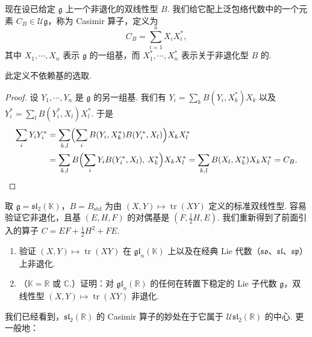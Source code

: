 \begin{numpara}[非退化不变双线性型]\label{np:lie-2-2-3}
现在设已给定 $\mathfrak g$ 上一个非退化的双线性型 $B$. 我们给它配上泛包络代数中的一个元素 $C_B\in\mathcal U\mathfrak g$，称为 Casimir 算子，定义为
\[
C_B=\sum_{i=1}^{n}X_iX_i^{*},
\]
其中 $X_1,\cdots,X_n$ 表示 $\mathfrak g$ 的一组基，而 $X_1^{*},\cdots,X_n^{*}$ 表示关于非退化型 $B$ 的.
\end{numpara}

\begin{lemma*}
此定义不依赖基的选取.
\end{lemma*}

\begin{proof}
设 $Y_1,\cdots,Y_n$ 是 $\mathfrak g$ 的另一组基. 我们有 $Y_i=\sum_k B(Y_i,X_k^{*})X_k$ 以及 $Y_i^{*}=\sum_l B(Y_i^{*},X_l)X_l^{*}$. 于是
\begin{align*}
\sum_i Y_iY_i^{*}
&=\sum_{k,l}\Bigl(\sum_i B(Y_i,X_k^{*})B(Y_i^{*},X_l)\Bigr)X_kX_l^{*}\\
&=\sum_{k,l}B\Bigl(\sum_i Y_iB(Y_i^{*},X_l),\,X_k^{*}\Bigr)X_kX_l^{*}
=\sum_{k,l}B(X_l,X_k^{*})X_kX_l^{*}=C_B.
\end{align*}
\end{proof}

\begin{example*}
取 $\mathfrak g=\mathfrak{sl}_2(\mathbb K)$，$B=B_{\mathrm{std}}$ 为由 $(X,Y)\mapsto\operatorname{tr}(XY)$ 定义的标准双线性型. 容易验证它非退化，且基 $(E,H,F)$ 的对偶基是 $(F,\tfrac12H,E)$. 我们重新得到了前面引入的算子 $C=EF+\tfrac12H^2+FE$.
\end{example*}

\begin{exercise*}
\begin{enumerate}[label=\roman*)]
\item 验证 $(X,Y)\mapsto\operatorname{tr}(XY)$ 在 $\mathfrak{gl}_n(\mathbb K)$ 上以及在经典 Lie 代数（$\mathfrak{so}$、$\mathfrak{sl}$、$\mathfrak{sp}$）上非退化.
\item （$\mathbb K=\mathbb R$ 或 $\mathbb C$.）证明：对 $\mathfrak{gl}_n(\mathbb R)$ 的任何在转置下稳定的 Lie 子代数 $\mathfrak g$，双线性型 $(X,Y)\mapsto\operatorname{tr}(XY)$ 非退化.
\end{enumerate}
\end{exercise*}

我们已经看到，$\mathfrak{sl}_2(\mathbb R)$ 的 Casimir 算子的妙处在于它属于 $\mathcal U\mathfrak{sl}_2(\mathbb R)$ 的中心. 更一般地：

